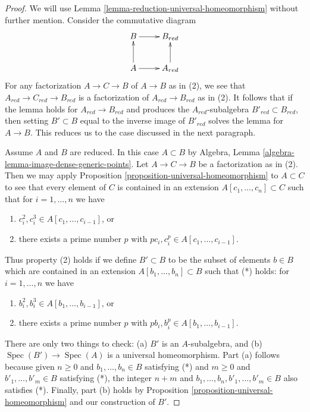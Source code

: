 \documentclass[10pt,a4paper]{amsart}
\theoremstyle{plain}
\theoremstyle{definition}
\theoremstyle{remark}
\numberwithin{equation}{subsection}
\def\Spec{\mathop{\mathrm{Spec}}}
\begin{document}
\begin{proof}
We will use Lemma \ref{lemma-reduction-universal-homeomorphism}
without further mention. Consider the commutative diagram
$$
\xymatrix{
B \ar[r] & B_{red} \\
A \ar[u] \ar[r] & A_{red} \ar[u]
}
$$
For any factorization $A \to C \to B$ of $A \to B$ as in (2), we see
that $A_{red} \to C_{red} \to B_{red}$ is a factorization of
$A_{red} \to B_{red}$ as in (2). It follows that if the
lemma holds for $A_{red} \to B_{red}$ and produces the $A_{red}$-subalgebra
$B'_{red} \subset B_{red}$, then setting $B' \subset B$
equal to the inverse image of $B'_{red}$ solves the lemma for
$A \to B$. This reduces us to the case discussed in the next paragraph.

\medskip\noindent
Assume $A$ and $B$ are reduced. In this case $A \subset B$ by
Algebra, Lemma \ref{algebra-lemma-image-dense-generic-points}.
Let $A \to C \to B$ be a factorization as in (2).
Then we may apply Proposition \ref{proposition-universal-homeomorphism}
to $A \subset C$ to see that every element of $C$ is contained
in an extension $A[c_1, \ldots, c_n] \subset C$ such that for
$i = 1, \ldots, n$ we have
\begin{enumerate}
\item $c_i^2, c_i^3 \in A[c_1, \ldots, c_{i - 1}]$, or
\item there exists a prime number $p$ with
$pc_i, c_i^p \in A[c_1, \ldots, c_{i - 1}]$.
\end{enumerate}
Thus property (2) holds if we define $B' \subset B$ to be the
subset of elements $b \in B$ which are contained in an extension
$
A[b_1, \ldots, b_n] \subset B
$
such that (*) holds: for $i = 1, \ldots, n$ we have
\begin{enumerate}
\item $b_i^2, b_i^3 \in A[b_1, \ldots, b_{i - 1}]$, or
\item there exists a prime number $p$ with
$pb_i, b_i^p \in A[b_1, \ldots, b_{i - 1}]$.
\end{enumerate}
There are only two things to check: (a) $B'$ is an $A$-subalgebra, and
(b) $\Spec(B') \to \Spec(A)$ is a universal homeomorphism.
Part (a) follows because given $n \geq 0$ and $b_1, \ldots, b_n \in B$
satisfying (*) and $m \geq 0$ and $b'_1, \ldots, b'_m \in B$
satisfying (*), the integer
$n + m$ and $b_1, \ldots, b_n, b'_1, \ldots, b'_m \in B$
also satisfies (*). Finally, part (b) holds by
Proposition \ref{proposition-universal-homeomorphism} and our construction
of $B'$.
\end{proof}
\end{document}
